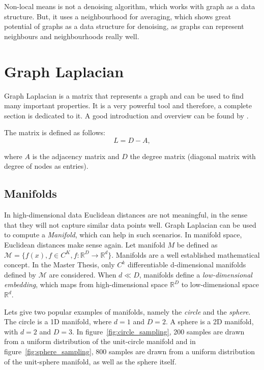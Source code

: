 Non-local means is not a denoising algorithm, which works with graph as a data structure.
But, it uses a neighbourhood for averaging, which shows great potential of graphs
as a data structure for denoising, as graphs can represent neighbours and neighbourhoods really well.


\section{Graph Laplacian}
Graph Laplacian is a matrix that represents a graph and can be used to find many important properties.
It is a very powerful tool and therefore, a complete section is dedicated to it.
A good introduction and overview can be found by \cite{tutorialSpectralClustering, SpectralGraphTheory}. 

The matrix is defined as follows:
\begin{equation}
    L = D - A,
\end{equation}

where $A$ is the adjacency matrix and $D$ the degree matrix (diagonal matrix with degree of nodes as entries).

\subsection{Manifolds}
\label{sec:manifolds}

In high-dimensional data Euclidean distances are not meaningful,
in the sense that they will not capture similar data points well.
Graph Laplacian can be used to compute a \textit{Manifold}, which can help in such scenarios. 
In manifold space, Euclidean distances make sense again. 
Let manifold $M$ be defined as $\mathcal{M} = \{ f(x), f \in C^K, f: \mathbb{R}^D \to \mathbb{R}^d \}$.
Manifolds are a well established mathematical concept. In the Master Thesis, only 
$C^k$ differentiable d-dimensional manifolds defined by $\mathcal{M}$ are considered. 
When $d \ll D$, manifolds define a \textit{low-dimensional embedding}, which maps from high-dimensional space 
$\mathbb{R}^D$ to low-dimensional space $\mathbb{R}^d$.

Lets give two popular examples of manifolds, namely the \textit{circle} and the \textit{sphere}.
The circle is a 1D manifold, where $d=1$ and $D=2$. A sphere is a 2D manifold, with $d=2$ and $D=3$.
In figure~\ref{fig:circle_sampling}, 200 samples are drawn from a uniform distribution of the unit-circle manifold
and in figure~\ref{fig:sphere_sampling}, 800 samples are drawn from a uniform distribution of the unit-sphere manifold,
as well as the sphere itself.

